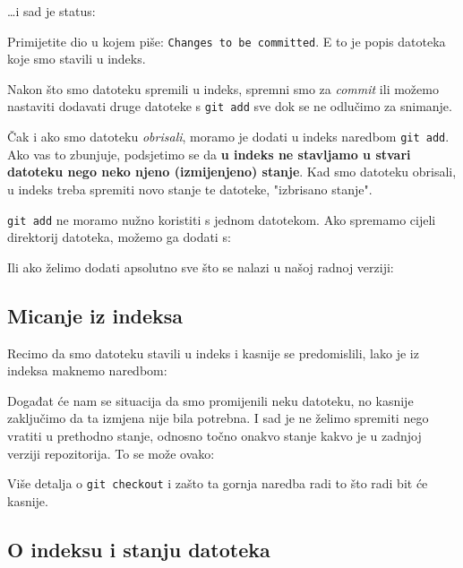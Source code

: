 \dots{}i sad je status:



Primijetite dio u kojem piše: \verb+Changes to be committed+. E to je popis datoteka koje smo stavili u indeks.

Nakon što smo datoteku spremili u indeks, spremni smo za \emph{commit} ili možemo nastaviti dodavati druge datoteke s \verb+git add+ sve dok se ne odlučimo za snimanje.

Čak i ako smo datoteku \emph{obrisali}, moramo je dodati u indeks naredbom \verb+git add+.
Ako vas to zbunjuje, podsjetimo se da \textbf{u indeks ne stavljamo u stvari datoteku nego neko njeno (izmijenjeno) stanje}.
Kad smo datoteku obrisali, u indeks treba spremiti novo stanje te datoteke, "izbrisano stanje".

\verb+git add+ ne moramo nužno koristiti s jednom datotekom.
Ako spremamo cijeli direktorij datoteka, možemo ga dodati s:


Ili ako želimo dodati apsolutno sve što se nalazi u našoj radnoj verziji:


\subsection*{Micanje iz indeksa}

Recimo da smo datoteku stavili u indeks i kasnije se predomislili, lako je iz indeksa maknemo naredbom:


Događat će nam se situacija da smo promijenili neku datoteku, no kasnije zaključimo da ta izmjena nije bila potrebna. 
I sad je ne želimo spremiti nego vratiti u prethodno stanje, odnosno točno onakvo stanje kakvo je u zadnjoj verziji repozitorija.
To se može ovako:


Više detalja o \verb+git checkout+ i zašto ta gornja naredba radi to što radi bit će kasnije.

\subsection*{O indeksu i stanju datoteka}

